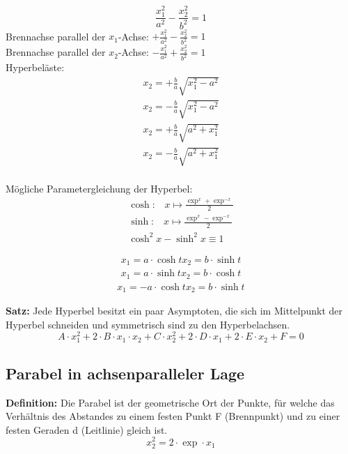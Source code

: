 \begin{equation}
  \frac{x_1^2}{a^2} - \frac{x_2^2}{b^2} = 1
\end{equation}
Brennachse parallel der $x_1$-Achse: $+\frac{x_1^2}{a^2}-\frac{x_2^2}{b^2}=1$\\
Brennachse parallel der $x_2$-Achse: $-\frac{x_1^2}{a^2}+\frac{x_2^2}{b^2}=1$\\

Hyperbel\"aste:
\begin{gather*}
  x_2 = +\frac{b}{a}\sqrt{x_1^2-a^2} \\
  x_2 = -\frac{b}{a}\sqrt{x_1^2-a^2} \\
  x_2 = +\frac{b}{a}\sqrt{a^2+x_1^2} \\
  x_2 = -\frac{b}{a}\sqrt{a^2+x_1^2} \\
\end{gather*}

M\"ogliche Parametergleichung der Hyperbel:
\begin{gather}
  \cosh \text{:}\quad x \longmapsto \frac{\exp^x+\exp^{-x}}{2} \\
  \sinh \text{:}\quad x \longmapsto \frac{\exp^x-\exp^{-x}}{2} \\
  \cosh^2{x}-\sinh^2{x} \equiv 1
\end{gather}

\begin{gather*}
  x_1 = a\cdot\cosh{t}
  x_2 = b\cdot\sinh{t}
\end{gather*}
\begin{gather*}
  x_1 = a\cdot\sinh{t}
  x_2 = b\cdot\cosh{t}
\end{gather*}
\begin{gather*}
  x_1 = -a\cdot \cosh{t}
  x_2 = b\cdot\sinh{t}
\end{gather*}

\textbf{Satz:} Jede Hyperbel besitzt ein paar Asymptoten, die sich im Mittelpunkt
der Hyperbel schneiden und symmetrisch sind zu den Hyperbelachsen.
\begin{equation}
  A\cdot x_1^2+2\cdot B\cdot x_1\cdot x_2+C\cdot x_2^2+2\cdot D\cdot x_1 + 2\cdot E\cdot x_2+F=0
\end{equation}


\subsection{Parabel in achsenparalleler Lage}
\textbf{Definition:} Die Parabel ist der geometrische Ort der Punkte, f\"ur welche das
Verh\"altnis des Abstandes zu einem festen Punkt F (Brennpunkt) und zu einer festen
Geraden d (Leitlinie) gleich ist.
\begin{equation}
  x_2^2 = 2\cdot\exp\cdot x_1
\end{equation}

